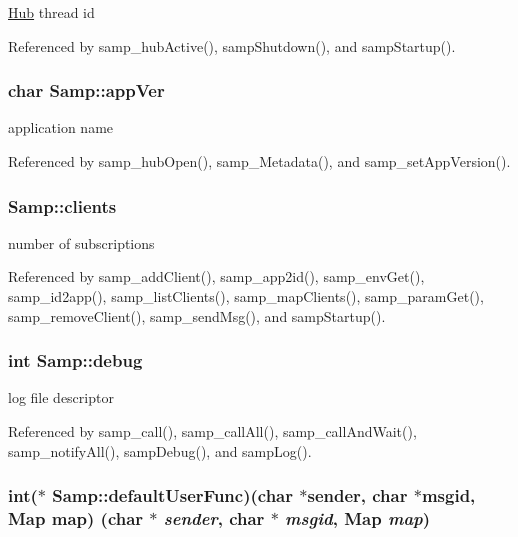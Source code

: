 \hyperlink{structHub}{Hub} thread id 

Referenced by samp\_\-hubActive(), sampShutdown(), and sampStartup().\hypertarget{structSamp_df7c497b6dbffc08e8ef5d7edd4ee97e}{
\subsubsection[{appVer}]{\setlength{\rightskip}{0pt plus 5cm}char {\bf Samp::appVer}}}
\label{structSamp_df7c497b6dbffc08e8ef5d7edd4ee97e}


application name 

Referenced by samp\_\-hubOpen(), samp\_\-Metadata(), and samp\_\-setAppVersion().\hypertarget{structSamp_2cc1f00b9e4bae456e0e72b90147df7b}{
\subsubsection[{clients}]{ {\bf Samp::clients}}}
\label{structSamp_2cc1f00b9e4bae456e0e72b90147df7b}


number of subscriptions 

Referenced by samp\_\-addClient(), samp\_\-app2id(), samp\_\-envGet(), samp\_\-id2app(), samp\_\-listClients(), samp\_\-mapClients(), samp\_\-paramGet(), samp\_\-removeClient(), samp\_\-sendMsg(), and sampStartup().\hypertarget{structSamp_d8469d2447cd872101fb83d92f85049e}{
\subsubsection[{debug}]{\setlength{\rightskip}{0pt plus 5cm}int {\bf Samp::debug}}}
\label{structSamp_d8469d2447cd872101fb83d92f85049e}


log file descriptor 

Referenced by samp\_\-call(), samp\_\-callAll(), samp\_\-callAndWait(), samp\_\-notifyAll(), sampDebug(), and sampLog().\hypertarget{structSamp_eb399d3fb381bee752b5747ff4cb9a9b}{
\subsubsection[{defaultUserFunc}]{\setlength{\rightskip}{0pt plus 5cm}int($\ast$ {\bf Samp::defaultUserFunc})(char $\ast$sender, char $\ast$msgid, {\bf Map} map) (char $\ast$ {\em sender}, \/  char $\ast$ {\em msgid}, \/  {\bf Map} {\em map})}}
\label{structSamp_eb399d3fb381bee752b5747ff4cb9a9b}


